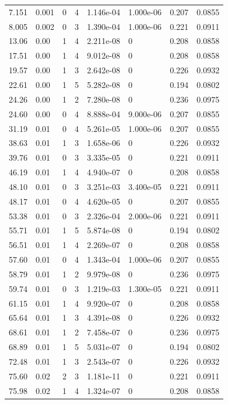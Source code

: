 \documentclass[preview]{standalone}
\begin{document}
{{\begin{tabular}{L{1.2cm}C{1.2cm} C{0.3cm}C{0.5cm} C{1.4cm}C{1.4cm} C{1.4cm}C{1.4cm}}
  7.151  &  0.001  & 0     &  4 &  1.146e-04  & 1.000e-06  & 0.207 &  0.0855   \\ 
  8.005  &  0.002  & 0     &  3 &  1.390e-04  & 1.000e-06  & 0.221 &  0.0911   \\ 
  13.06  &  0.00  & 1     &  4 &  2.211e-08  & 0  & 0.208 &  0.0858   \\ 
  17.51  &  0.00  & 1     &  4 &  9.012e-08  & 0  & 0.208 &  0.0858   \\ 
  19.57  &  0.00  & 1     &  3 &  2.642e-08  & 0  & 0.226 &  0.0932   \\ 
  22.61  &  0.00  & 1     &  5 &  5.282e-08  & 0  & 0.194 &  0.0802   \\ 
  24.26  &  0.00  & 1     &  2 &  7.280e-08  & 0  & 0.236 &  0.0975   \\ 
  24.60  &  0.00  & 0     &  4 &  8.888e-04  & 9.000e-06  & 0.207 &  0.0855   \\ 
  31.19  &  0.01  & 0     &  4 &  5.261e-05  & 1.000e-06  & 0.207 &  0.0855   \\ 
  38.63  &  0.01  & 1     &  3 &  1.658e-06  & 0  & 0.226 &  0.0932   \\ 
  39.76  &  0.01  & 0     &  3 &  3.335e-05  & 0  & 0.221 &  0.0911   \\ 
  46.19  &  0.01  & 1     &  4 &  4.940e-07  & 0  & 0.208 &  0.0858   \\ 
  48.10  &  0.01  & 0     &  3 &  3.251e-03  & 3.400e-05  & 0.221 &  0.0911   \\ 
  48.17  &  0.01  & 0     &  4 &  4.620e-05  & 0  & 0.207 &  0.0855   \\ 
  53.38  &  0.01  & 0     &  3 &  2.326e-04  & 2.000e-06  & 0.221 &  0.0911   \\ 
  55.71  &  0.01  & 1     &  5 &  5.874e-08  & 0  & 0.194 &  0.0802   \\ 
  56.51  &  0.01  & 1     &  4 &  2.269e-07  & 0  & 0.208 &  0.0858   \\ 
  57.60  &  0.01  & 0     &  4 &  1.343e-04  & 1.000e-06  & 0.207 &  0.0855   \\ 
  58.79  &  0.01  & 1     &  2 &  9.979e-08  & 0  & 0.236 &  0.0975   \\ 
  59.74  &  0.01  & 0     &  3 &  1.219e-03  & 1.300e-05  & 0.221 &  0.0911   \\ 
  61.15  &  0.01  & 1     &  4 &  9.920e-07  & 0  & 0.208 &  0.0858   \\ 
  65.64  &  0.01  & 1     &  3 &  4.391e-08  & 0  & 0.226 &  0.0932   \\ 
  68.61  &  0.01  & 1     &  2 &  7.458e-07  & 0  & 0.236 &  0.0975   \\ 
  68.89  &  0.01  & 1     &  5 &  5.031e-07  & 0  & 0.194 &  0.0802   \\ 
  72.48  &  0.01  & 1     &  3 &  2.543e-07  & 0  & 0.226 &  0.0932   \\ 
  75.60  &  0.02  & 2     &  3 &  1.181e-11  & 0  & 0.221 &  0.0911   \\ 
  75.98  &  0.02  & 1     &  4 &  1.324e-07  & 0  & 0.208 &  0.0858   \\ 
\hline 
\end{tabular} 

}}
\end{document}
